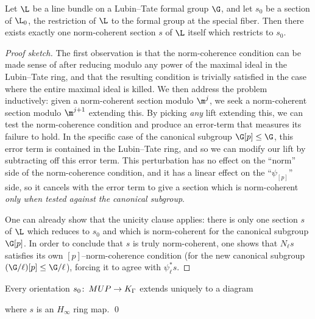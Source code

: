 \begin{theorem}\label{AndosAlgebraicTheorem}
Let $\L$ be a line bundle on a Lubin--Tate formal group $\G$, and let $s_0$ be a section of $\L_0$, the restriction of $\L$ to the formal group at the special fiber.  Then there exists exactly one norm-coherent section $s$ of $\L$ itself which restricts to $s_0$.
\end{theorem}
\begin{proof}[Proof sketch]
The first observation is that the norm-coherence condition can be made sense of after reducing modulo any power of the maximal ideal in the Lubin--Tate ring, and that the resulting condition is trivially satisfied in the case where the entire maximal ideal is killed.  We then address the problem inductively: given a norm-coherent section modulo $\m^j$, we seek a norm-coherent section modulo $\m^{j+1}$ extending this.  By picking \emph{any} lift extending this, we can test the norm-coherence condition and produce an error-term that measures its failure to hold.  In the specific case of the canonical subgroup $\G[p] \le \G$, this error term is contained in the Lubin--Tate ring, and so we can modify our lift by subtracting off this error term.  This perturbation has no effect on the ``norm'' side of the norm-coherence condition, and it has a linear effect on the ``$\psi_{[p]}$'' side, so it cancels with the error term to give a section which is norm-coherent \emph{only when tested against the canonical subgroup}.

One can already show that the unicity clause applies: there is only one section $s$ of $\L$ which reduces to $s_0$ and which is norm-coherent for the canonical subgroup $\G[p]$.  In order to conclude that $s$ is truly norm-coherent, one shows that $N_\ell s$ satisfies its own $[p]$--norm-coherence condition (for the new canonical subgroup $(\G / \ell)[p] \le \G / \ell$), forcing it to agree with $\psi_\ell^* s$.
\end{proof}

\begin{corollary}\label{AHSHinftyResultForEthy}
Every orientation $s_0\colon\thinspace MUP \to K_\Gamma$ extends uniquely to a diagram
\begin{center}
\end{center}
where $s$ is an $H_\infty$ ring map. \qed
\end{corollary}

